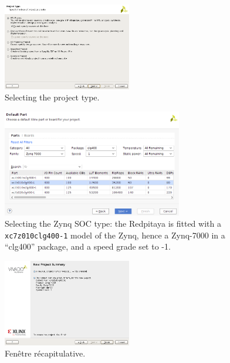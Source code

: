 \documentclass[10pt,oneside]{article}
\begin{document}
\begin{figure}[h!tb]
\begin{center}
\includegraphics[width=0.5\textwidth]{./createProj_selectType.png}
\end{center}
\caption{Selecting the project type.}
\label{createProj_selectType}
\end{figure}
\begin{figure}[h!tb]
\begin{center}
\includegraphics[width=0.7\textwidth]{./createProj_selectPart2019.png}
\end{center}
\caption{Selecting the Zynq SOC type: the Redpitaya is fitted with a {\tt xc7z010clg400-1} model
of the Zynq, hence a Zynq-7000 in a ``clg400'' package, and a speed grade set to -1.}
\label{createProj_selectpart}
\end{figure}
\begin{figure}[h!tb]
\begin{center}
\includegraphics[width=0.5\textwidth]{./createProj_summary.png}
\end{center}
\caption{Fen\^etre r\'ecapitulative.}
\label{createProj_summary}
\end{figure}
\end{document}
